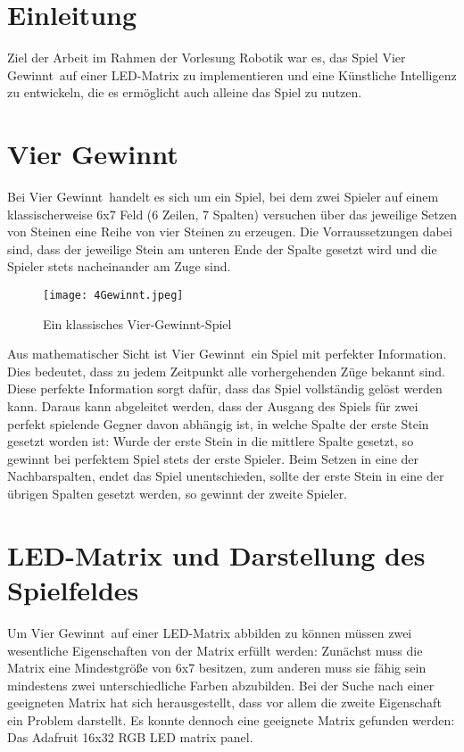 \section{Einleitung}
Ziel der Arbeit im Rahmen der Vorlesung Robotik war es, das Spiel \glqq Vier Gewinnt\grqq ~auf einer LED-Matrix zu implementieren und eine Künstliche Intelligenz zu entwickeln, die es ermöglicht auch alleine das Spiel zu nutzen.

\section{Vier Gewinnt}
\label{sec:vierg}
Bei \glqq Vier Gewinnt\grqq ~handelt es sich um ein Spiel, bei dem zwei Spieler auf einem klassischerweise 6x7 Feld (6 Zeilen, 7 Spalten) versuchen über das jeweilige Setzen von Steinen eine Reihe von vier Steinen zu erzeugen. Die Vorraussetzungen dabei sind, dass der jeweilige Stein am unteren Ende der Spalte gesetzt wird und die Spieler stets nacheinander am Zuge sind.

\begin{figure}[!hbt]
	\centering
	\texttt{[image: 4Gewinnt.jpeg]}
	\caption{Ein klassisches Vier-Gewinnt-Spiel}
\end{figure}

Aus mathematischer Sicht ist \glqq Vier Gewinnt\grqq ~ein Spiel mit perfekter Information. Dies bedeutet, dass zu jedem Zeitpunkt alle vorhergehenden Züge bekannt sind. Diese perfekte Information sorgt dafür, dass das Spiel vollständig gelöst werden kann. Daraus kann abgeleitet werden, dass der Ausgang des Spiels für zwei perfekt spielende Gegner davon abhängig ist, in welche Spalte der erste Stein gesetzt worden ist: Wurde der erste Stein in die mittlere Spalte gesetzt, so gewinnt bei perfektem Spiel stets der erste Spieler. Beim Setzen in eine der Nachbarspalten, endet das Spiel unentschieden, sollte der erste Stein in eine der übrigen Spalten gesetzt werden, so gewinnt der zweite Spieler. 

\section{LED-Matrix und Darstellung des Spielfeldes}
\label{sec:ledm}
Um \glqq Vier Gewinnt\grqq ~auf einer LED-Matrix abbilden zu können müssen zwei wesentliche Eigenschaften von der Matrix erfüllt werden: Zunächst muss die Matrix eine Mindestgröße von 6x7 besitzen, zum anderen muss sie fähig sein mindestens zwei unterschiedliche Farben abzubilden.
Bei der Suche nach einer geeigneten Matrix hat sich herausgestellt, dass vor allem die zweite Eigenschaft ein Problem darstellt.
Es konnte dennoch eine geeignete Matrix gefunden werden:
Das \glqq Adafruit 16x32 RGB LED matrix panel\grqq.

